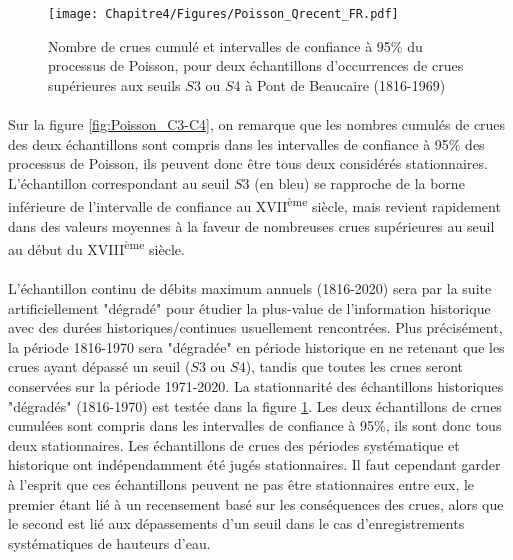 	\begin{figure}[h!]
		\centering
		\texttt{[image: Chapitre4/Figures/Poisson\_Qrecent\_FR.pdf]}	
		\caption{Nombre de crues cumulé et intervalles de confiance à 95\% du processus de 						Poisson, pour deux échantillons d'occurrences de crues supérieures aux seuils $S3$ ou $S4$ à Pont de Beaucaire (1816-1969) }
		\label{fig:Poisson_Recent}
	\end{figure}
	
	
	\paragraph{} Sur la figure \ref{fig:Poisson_C3-C4}, on remarque que les nombres cumulés de crues des deux échantillons sont compris dans les intervalles de confiance à 95\% des processus de Poisson, ils peuvent donc être tous deux considérés stationnaires. L'échantillon correspondant au seuil $S3$ (en bleu) se rapproche de la borne inférieure de l'intervalle de confiance au XVII\textsuperscript{ème} siècle, mais revient rapidement dans des valeurs moyennes à la faveur de nombreuses crues supérieures au seuil au début du XVIII\textsuperscript{ème} siècle. 
	
	\paragraph{} L'échantillon continu de débits maximum annuels (1816-2020) sera par la suite artificiellement "dégradé" pour étudier la plus-value de l'information historique avec des durées historiques/continues usuellement rencontrées. Plus précisément, la période 1816-1970 sera "dégradée" en période historique en ne retenant que les crues ayant dépassé un seuil ($S3$ ou $S4$), tandis que toutes les crues seront conservées sur la période 1971-2020. La stationnarité des échantillons historiques "dégradés" (1816-1970) est testée dans la figure \ref{fig:Poisson_Recent}. Les deux échantillons de crues cumulées sont compris dans les intervalles de confiance à 95\%, ils sont donc tous deux stationnaires. Les échantillons de crues des périodes systématique et historique ont indépendamment été jugés stationnaires. Il faut cependant garder à l'esprit que ces échantillons peuvent ne pas être stationnaires entre eux, le premier étant lié à un recensement basé sur les conséquences des crues, alors que le second est lié aux dépassements d'un seuil dans le cas d'enregistrements systématiques de hauteurs d'eau.
	

